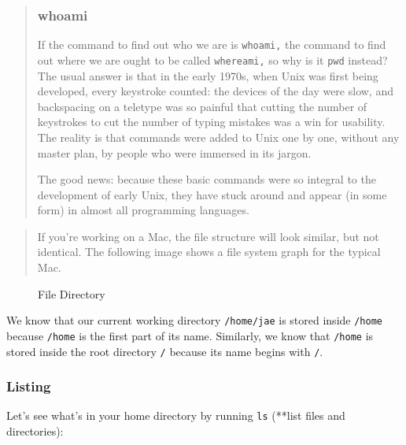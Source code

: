 \documentclass[
]{book}
\newenvironment{Shaded}{\begin{snugshade}}{\end{snugshade}}
\newcommand{\ExtensionTok}[1]{#1}
\newcommand{\NormalTok}[1]{#1}
\begin{document}
\begin{quote}
\subsubsection{whoami}\label{whoami}

If the command to find out who we are is \texttt{whoami,} the command to find out where we are ought to be called \texttt{whereami,} so why is it \texttt{pwd} instead? The usual answer is that in the early 1970s, when Unix was first being developed, every keystroke counted: the devices of the day were slow, and backspacing on a teletype was so painful that cutting the number of keystrokes to cut the number of typing mistakes was a win for usability. The reality is that commands were added to Unix one by one, without any master plan, by people who were immersed in its jargon.

The good news: because these basic commands were so integral to the development of early Unix, they have stuck around and appear (in some form) in almost all programming languages.
\end{quote}

\begin{quote}
If you're working on a Mac, the file structure will look similar, but not identical. The following image shows a file system graph for the typical Mac.
\end{quote}

\begin{figure}
\centering

\caption{File Directory}
\end{figure}

We know that our current working directory \texttt{/home/jae} is stored inside \texttt{/home} because \texttt{/home} is the first part of its name. Similarly, we know that \texttt{/home} is stored inside the root directory \texttt{/} because its name begins with \texttt{/}.

\subsubsection{Listing}\label{listing}

Let's see what's in your home directory by running \texttt{ls} (**list files and directories):

\begin{Shaded}
\end{Shaded}
\end{document}
